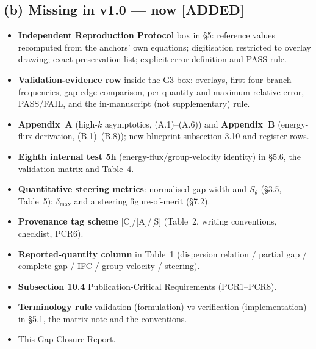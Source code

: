 \documentclass[11pt,a4paper]{article}
\newcommand{\ADDED}{{\color{addcol}\textbf{[ADDED]}}}
\begin{document}
\subsection*{(b) Missing in v1.0 --- now \ADDED}
\begin{itemize}
\item \textbf{Independent Reproduction Protocol} box in \S5: reference values recomputed
from the anchors' own equations; digitisation restricted to overlay drawing; exact-preservation
list; explicit error definition and PASS rule.
\item \textbf{Validation-evidence row} inside the G3 box: overlays, first four branch
frequencies, gap-edge comparison, per-quantity and maximum relative error, PASS/FAIL, and
the in-manuscript (not supplementary) rule.
\item \textbf{Appendix~A} (high-$k$ asymptotics, (A.1)--(A.6)) and \textbf{Appendix~B}
(energy-flux derivation, (B.1)--(B.8)); new blueprint subsection 3.10 and register rows.
\item \textbf{Eighth internal test 5h} (energy-flux/group-velocity identity) in \S5.6, the
validation matrix and Table~4.
\item \textbf{Quantitative steering metrics}: normalised gap width and $S_\theta$ (\S3.5,
Table~5); $\delta_{\max}$ and a steering figure-of-merit (\S7.2).
\item \textbf{Provenance tag scheme} [C]/[A]/[S] (Table~2, writing conventions, checklist, PCR6).
\item \textbf{Reported-quantity column} in Table~1 (dispersion relation / partial gap /
complete gap / IFC / group velocity / steering).
\item \textbf{Subsection 10.4} Publication-Critical Requirements (PCR1--PCR8).
\item \textbf{Terminology rule} validation (formulation) vs verification (implementation)
in \S5.1, the matrix note and the conventions.
\item This Gap Closure Report.
\end{itemize}
\end{document}
